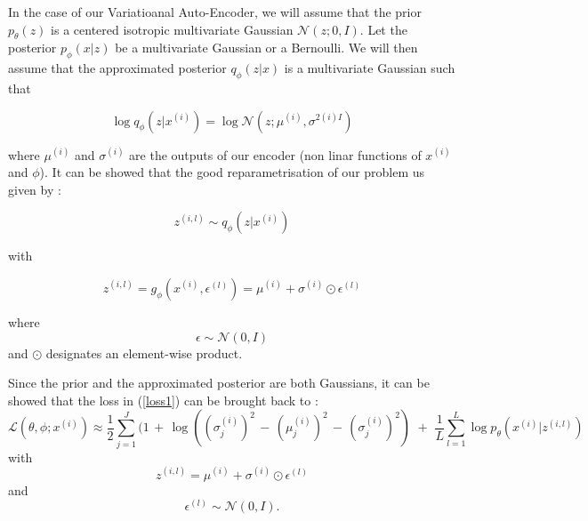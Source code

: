 \documentclass{article}
\begin{document}
In the case of our Variatioanal Auto-Encoder, we will assume that the prior $p_\theta (z)$ is a centered isotropic multivariate Gaussian $\mathcal{N}(z;0,I)$. Let the posterior $p_\phi (x | z)$ be a multivariate Gaussian or a Bernoulli. We will then assume that the approximated posterior $q_\phi (z|x)$ is a multivariate Gaussian such that


\begin{center}
    \begin{equation*}
        \log q_\phi(z|x^{(i)}) = \log \mathcal{N} (z; \mu^{(i)}, \sigma^{2(i)I})  
    \end{equation*}
\end{center}


where $\mu^{(i)}$ and $\sigma^{(i)}$ are the outputs of our encoder (non linar functions of $x^{(i)}$ and $\phi$). It can be showed that the good reparametrisation of our problem us given by :

\begin{center}
    \begin{equation*}
        z^{(i,l)} \sim q_\phi (z|x^{(i)})
    \end{equation*}
\end{center}
with 

\begin{center}
    \begin{equation*}
        z^{(i,l)} = g_\phi (x^{(i)}, \epsilon^{(l)}) = \mu^{(i)} + \sigma^{(i)}  \odot\epsilon^{(l)}
\end{equation*}
\end{center}
where 
\begin{equation*}
    \epsilon \sim \mathcal{N}(0,I)
\end{equation*}
and $\odot$ designates an element-wise product.

Since the prior and the approximated posterior are both Gaussians, it can be showed that the loss in (\ref{loss1}) can be brought back to :
\begin{equation}\label{loss2}
    \mathcal{L}(\theta, \phi; x^{(i)}) \approx \frac{1}{2} \sum_{j=1}^{J} (1 \,+\, \log((\sigma_j^{(i)})^2 \,-\, (\mu_j^{(i)})^2 \,-\,(\sigma_j^{(i)})^2)\,\,+\,\,\frac{1}{L}\sum_{l=1}^{L} \log p_\theta(x^{(i)} | z^{(i,l)})
\end{equation}
with
\begin{equation*}
    z^{(i,l)}=\mu^{(i)} + \sigma^{(i)} \odot \epsilon^{(l)}
\end{equation*}
and 
\begin{equation*}
    \epsilon^{(l)} \sim \mathcal{N}(0,I).
\end{equation*}
\end{document}
